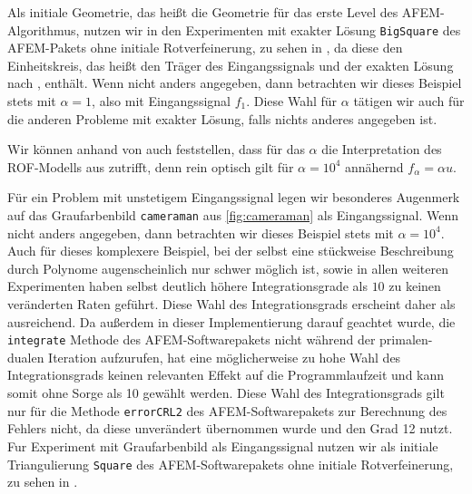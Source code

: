 Als initiale Geometrie, das heißt die Geometrie für das erste Level des
AFEM-Al\-go\-rith\-mus, nutzen wir in den Experimenten mit exakter Lösung
\texttt{BigSquare} des AFEM-Pakets ohne initiale Rotverfeinerung, zu sehen in
, da diese den Einheitskreis, das heißt den Träger
des Eingangssignals und der exakten Lösung nach
, enthält.
Wenn nicht anders angegeben, dann betrachten wir dieses Beispiel stets mit
$\alpha=1$, also mit Eingangssignal $f_1$. 
Diese Wahl für $\alpha$ tätigen wir auch für die anderen Probleme mit 
exakter Lösung, falls nichts anderes angegeben ist.

Wir können anhand von  auch feststellen, dass für das
$\alpha$ die Interpretation des ROF-Modells aus 
zutrifft, denn rein optisch gilt für $\alpha=10^4$ annähernd $f_\alpha=\alpha
u$.

Für ein Problem mit unstetigem Eingangssignal legen wir besonderes
Augenmerk auf das Graufarbenbild \texttt{cameraman} aus \cref{fig:cameraman}
als Eingangssignal. 
Wenn nicht anders angegeben, dann betrachten wir dieses Beispiel stets mit
$\alpha=10^4$.
Auch für dieses komplexere Beispiel, bei der selbst eine stückweise
Beschreibung durch Polynome augenscheinlich nur schwer möglich ist, sowie in
allen weiteren Experimenten haben selbst deutlich höhere Integrationsgrade als
$10$ zu keinen veränderten Raten geführt. 
Diese Wahl des Integrationsgrads erscheint daher als ausreichend.
Da außerdem in dieser Implementierung darauf geachtet wurde, die
\texttt{integrate} Methode des AFEM-Softwarepakets \cite{Car09} nicht während
der primalen-dualen Iteration aufzurufen, hat eine möglicherweise zu hohe Wahl
des Integrationsgrads keinen relevanten Effekt auf die Programmlaufzeit und
kann somit ohne Sorge als 10 gewählt werden.
Diese Wahl des Integrationsgrads gilt nur für die Methode \texttt{errorCRL2}
des AFEM-Softwarepakets zur Berechnung des Fehlers nicht, da diese unverändert
übernommen wurde und den Grad 12 nutzt.
Fur Experiment mit Graufarbenbild als Eingangssignal nutzen wir als initiale
Triangulierung \texttt{Square} des AFEM-Softwarepakets ohne initiale
Rotverfeinerung, zu sehen in .

